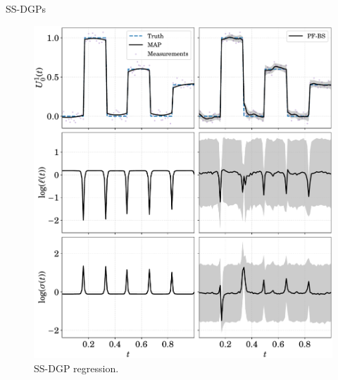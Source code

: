 \documentclass[seriffont, cmap=Beijing, 10pt]{zz}
\begin{document}
\begin{frame}{SS-DGPs}
	\begin{figure}
		\begin{minipage}[c]{.62\linewidth}
			\centering
			\includegraphics[width=\linewidth]{../thesis_latex/figs/ssdgp-reg-rect}
		\end{minipage}
		\begin{minipage}[c]{.37\linewidth}
			\caption{SS-DGP regression.}
		\end{minipage}
	\end{figure}
\end{frame}
\end{document}
